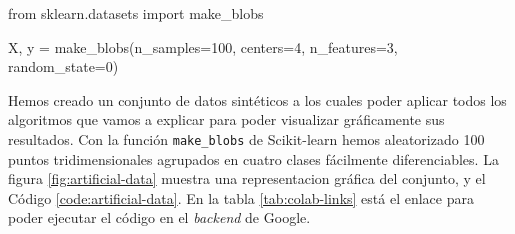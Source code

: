 \begin{mypython}[float={h}, caption={Generar datos artificiales de prueba.}, label={code:artificial-data}]
  from sklearn.datasets import make_blobs

  X, y = make_blobs(n_samples=100, centers=4,
                  n_features=3, random_state=0)
\end{mypython}

Hemos creado un conjunto de datos sintéticos a los cuales poder aplicar todos los algoritmos que vamos a explicar para poder visualizar gráficamente sus resultados. Con la función \texttt{make\_blobs} de Scikit-learn hemos aleatorizado 100 puntos tridimensionales agrupados en cuatro clases fácilmente diferenciables. La figura \ref{fig:artificial-data} muestra una representacion gráfica del conjunto, y el Código \ref{code:artificial-data}. En la tabla \ref{tab:colab-links} está el enlace para poder ejecutar el código en el \textit{backend} de Google.

